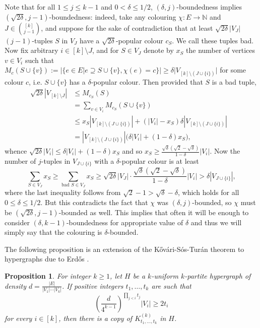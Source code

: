 \documentclass[11pt]{article}
\theoremstyle{plain}
\newtheorem{proposition}[theorem]{Proposition}
\theoremstyle{definition}
\newcommand{\N}{\mathbb{N}}
\newcommand{\cmpltt}[3]{K^{(#1)}_{#2,\dots,#3}}
\begin{document}
Note that for all $1\le j\le k-1$ and $0<\delta\le 1/2$, $(\delta,j)$-boundedness implies $(\sqrt{2\delta},j-1)$-boundedness: indeed, take any colouring $\chi:E\to \N$ and $J\in\binom{[k]}{j-1}$, and suppose for the sake of contradiction that at least $\sqrt{2\delta}|V_J|$ $(j-1)$-tuples $S$ in $V_J$ have a $\sqrt{2\delta}$-popular colour $c_S$. We call these tuples bad. Now fix arbitrary $i\in[k]\setminus J$, and for $S\in V_J$ denote by $x_S$ the number of vertices $v\in V_i$ such that $M_c(S\cup\{v\}):=|\{e\in E|e\supseteq S\cup\{v\},\chi(e)=c\}|\ge \delta|V_{[k]\setminus(J\cup\{i\})}|$ for some colour $c$, i.e. $S\cup\{v\}$ has a $\delta$-popular colour. Then provided that $S$ is a bad tuple,
\begin{align*}
    \sqrt{2\delta}|V_{[k]\setminus J}|&\le M_{c_S}(S)&\\&=\sum_{v\in V_i} M_{c_S}(S\cup\{v\})\\&\le x_S|V_{[k]\setminus(J\cup\{i\})}|+(|V_i|-x_S)\delta|V_{[k]\setminus(J\cup\{i\})}|\\&=|V_{[k]\setminus(J\cup\{i\})}|\big(\delta|V_i|+(1-\delta)x_S\big),
\end{align*}
whence $\sqrt{2\delta}|V_i|\le \delta|V_i|+(1-\delta)x_S$ and so $x_S\ge \frac{\sqrt{\delta}\left(\sqrt2-\sqrt{\delta}\right)}{1-\delta}|V_i|$. Now the number of $j$-tuples in $V_{J\cup\{i\}}$ with a $\delta$-popular colour is at least
$$\sum_{S\in V_J}x_S\ge\sum_{\textrm{bad }S\in V_J}x_S\ge \sqrt{2\delta}|V_J|\cdot\frac{\sqrt{\delta}\left(\sqrt{2}-\sqrt{\delta}\right)}{1-\delta}|V_i|>\delta|V_{J\cup\{i\}}|,$$
where the last inequality follows from $\sqrt{2}-1>\sqrt{\delta}-\delta$, which holds for all $0\le\delta\le1/2$. But this contradicts the fact that $\chi$ was $(\delta,j)$-bounded, so $\chi$ must be $(\sqrt{2\delta},j-1)$-bounded as well. This implies that often it will be enough to consider $(\delta,k-1)$-boundedness for appropriate value of $\delta$ and thus we will simply say that the colouring is $\delta$-bounded.

The following proposition is an extension of the K\H{o}v\'ari-S\'os-Tur\'an theorem \cite{kHovari1954problem} to hypergraphs due to Erd\H{o}s \cite{erdos1964extremal}.

\begin{proposition}\label{prop-kst}
    For integer $k\ge1$, let $H$ be a $k$-uniform $k$-partite hypergraph of density $d=\frac{|E|}{|V_1|\cdots|V_k|}$. If positive integers $t_1,\dots,t_k$ are such that
    $$\left(\frac{d}{4^{k-1}}\right)^{\prod_{j<i}t_j}|V_i|\ge2t_i$$
    for every $i\in[k]$, then there is a copy of $\cmpltt{k}{t_1}{t_k}$ in $H$.
\end{proposition}
\end{document}
